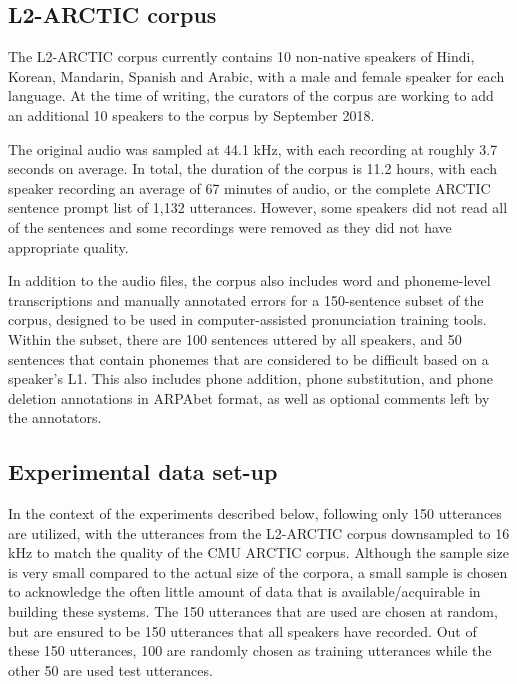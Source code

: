 \documentclass
[
    a4paper,
    twoside,
    12pt,
]
{report}
\begin{document}
\hypertarget{l2-arctic-corpus}{%
\subsection{L2-ARCTIC corpus}\label{l2-arctic-corpus}}

The L2-ARCTIC corpus currently contains 10 non-native speakers of Hindi,
Korean, Mandarin, Spanish and Arabic, with a male and female speaker for
each language. At the time of writing, the curators of the corpus are
working to add an additional 10 speakers to the corpus by September
2018.

The original audio was sampled at 44.1 kHz, with each recording at
roughly 3.7 seconds on average. In total, the duration of the corpus is
11.2 hours, with each speaker recording an average of 67 minutes of
audio, or the complete ARCTIC sentence prompt list of 1,132 utterances.
However, some speakers did not read all of the sentences and some
recordings were removed as they did not have appropriate quality.

In addition to the audio files, the corpus also includes word and
phoneme-level transcriptions and manually annotated errors for a
150-sentence subset of the corpus, designed to be used in
computer-assisted pronunciation training tools. Within the subset, there
are 100 sentences uttered by all speakers, and 50 sentences that contain
phonemes that are considered to be difficult based on a speaker's L1.
This also includes phone addition, phone substitution, and phone
deletion annotations in ARPAbet format, as well as optional comments
left by the annotators.

\hypertarget{experimental-data-set-up}{%
\subsection{Experimental data set-up}\label{experimental-data-set-up}}

In the context of the experiments described below, following
\textcite{zhao2018a} only 150 utterances are utilized, with the
utterances from the L2-ARCTIC corpus downsampled to 16 kHz to match the
quality of the CMU ARCTIC corpus. Although the sample size is very small
compared to the actual size of the corpora, a small sample is chosen to
acknowledge the often little amount of data that is available/acquirable
in building these systems. The 150 utterances that are used are chosen
at random, but are ensured to be 150 utterances that all speakers have
recorded. Out of these 150 utterances, 100 are randomly chosen as
training utterances while the other 50 are used test utterances.
\end{document}
